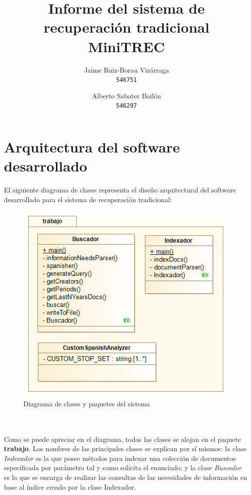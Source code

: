 \documentclass[a4paper]{article}
\begin{document}
\title{Informe del sistema de recuperación tradicional MiniTREC}
\author{
	Jaime Ruiz-Borau Vizárraga\\
	\texttt{546751}
	\and
	Alberto Sabater Bailón\\
	\texttt{546297}
	}
\date{}
\maketitle

\section{Arquitectura del software desarrollado}
\paragraph{}El siguiente diagrama de clases representa el diseño arquitectural del software desarrollado para el sistema de recuperación tradicional:
\begin{figure}[!hb]
	\includegraphics[width=\linewidth]{DiagramClass.png}
	\caption{Diagrama de clases y paquetes del sistema}
	\label{fig:class}
\end{figure}
\\
\newpage
\paragraph{}Como se puede apreciar en el diagrama, todas las clases se alojan en el paquete \textbf{trabajo}. Los nombres de las principales clases se explican por sí mismos: la clase \textit{Indexador} es la que posee métodos para indexar una colección de documentos especificada por parámetro tal y como solicita el enunciado; y la clase \textit{Buscador} es la que se encarga de realizar las consultas de las necesidades de información en base al índice creado por la clase Indexador.
\end{document}
